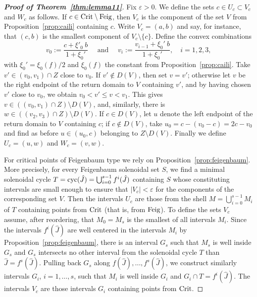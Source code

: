 \documentclass[12pt, psamsfonts, reqno]{amsart}
\begin{document}
\begin{proof}[\textbf{Proof of Theorem~\ref{thm:lemma11}}]

Fix ${\varepsilon}>0$. We define the sets $c\in U_c\subset V_c$ and $W_c$
as follows. If $c\in {\mathop{\rm Crit}\nolimits}\setminus {\mathop{\rm Feig}\nolimits}$, then $V_c$ is the
component of the set $V$ from Proposition~\ref{prop:caili}
containing $c$. Write $V_c=(a,b)$ and say, for instance, that
$(c,b)$ is the smallest component of $V_c\setminus\{c\}$. Define
the convex combinations
$$
v_0 := \frac{c +  \xi'_0\ b}{1+\xi_0'}
\quad \text{ and } \quad
v_i := \frac{v_{i-1} + \xi_0'\ b}{1+\xi_0'}, \quad i=1,2,3,
$$
with $\xi_0'=\xi_0(f)/2$ and $\xi_0(f)$ the constant from
Proposition~\ref{prop:caili}. Take $v' \in (v_0, v_1) \cap Z$
close to $v_0$. If $v' \notin D(V)$, then set $v = v'$; otherwise
let $v$ be the right endpoint of the return domain to $V$
containing $v'$, and by having chosen $v'$ close to $v_0$, we
obtain $v_0 < v' \leq v < v_1$. This gives $v\in ((v_0,v_1) \cap Z
) \setminus D(V)$, and, similarly, there is $w \in ((v_2,v_3) \cap
Z ) \setminus D(V)$. If $c \in D(V)$, let $u$ denote the left
endpoint of the return domain to $V$ containing $c$; if $c\notin
D(V)$, take $u_0=c-(v_0-c)=2c-v_0$ and find as before $u\in
(u_0,c)$ belonging to $Z\setminus D(V)$. Finally we define
$U_c=(u, w)$ and $W_c=(v, w )$.

For critical points of Feigenbaum type we rely on
Proposition~\ref{prop:feigenbaum}. More precisely, for every
Feigenbaum solenoidal set $S$, we find a minimal solenoidal cycle
$T={\mathop{\rm cyc}\nolimits}(\hat J)=\bigcup_{i=0}^{s-1} f^i(\hat J)$ containing $S$
whose constituting intervals are small enough
to ensure that $|V_c| < {\varepsilon}$ for the components of the corresponding set $V$.
Then the intervals
$U_c$ are those from the shell $M=\bigcup_{i=0}^{s-1} M_i$ of $T$
containing points from ${\mathop{\rm Crit}\nolimits}$ (that is, from ${\mathop{\rm Feig}\nolimits}$). To define
the sets $V_c$ assume, after reordering, that $M_0=M_s$ is the
smallest of all intervals $M_i$. Since the intervals $f^i(\hat J)$
are well centered in the intervals $M_i$ by
Proposition~\ref{prop:feigenbaum}, there is an interval $G_s$ such
that $M_s$ is well inside $G_s$ and $G_s$ intersects no other
interval from the solenoidal cycle $T$ than $\hat J=f^s(\hat J)$.
Pulling back $G_s$ along $f(\hat J),\ldots, f^s(\hat J)$, we
construct similarly intervals $G_i$, $i=1,\ldots,s$, such that
$M_i$ is well inside $G_i$ and $G_i\cap T=f^i(\hat J)$. The
intervals $V_c$ are those intervals $G_i$ containing points from
${\mathop{\rm Crit}\nolimits}$.


\end{proof}
\end{document}
